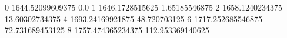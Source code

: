 0 1644.52099609375 0.0
1 1646.1728515625 1.65185546875
2 1658.1240234375 13.60302734375
4 1693.24169921875 48.720703125
6 1717.252685546875 72.731689453125
8 1757.474365234375 112.953369140625
